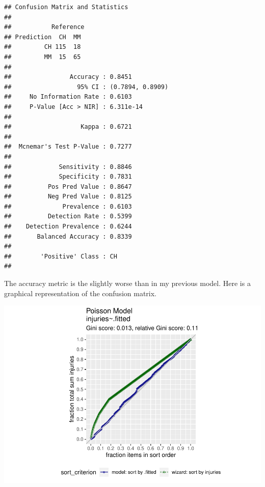 \documentclass[]{book}
\newenvironment{Shaded}{\begin{snugshade}}{\end{snugshade}}
\newcommand{\DataTypeTok}[1]{\textcolor[rgb]{0.13,0.29,0.53}{#1}}
\newcommand{\DecValTok}[1]{\textcolor[rgb]{0.00,0.00,0.81}{#1}}
\newcommand{\KeywordTok}[1]{\textcolor[rgb]{0.13,0.29,0.53}{\textbf{#1}}}
\newcommand{\NormalTok}[1]{#1}
\newcommand{\OperatorTok}[1]{\textcolor[rgb]{0.81,0.36,0.00}{\textbf{#1}}}
\newcommand{\StringTok}[1]{\textcolor[rgb]{0.31,0.60,0.02}{#1}}
\begin{document}
\begin{verbatim}
## Confusion Matrix and Statistics
## 
##           Reference
## Prediction  CH  MM
##         CH 115  18
##         MM  15  65
##                                           
##                Accuracy : 0.8451          
##                  95% CI : (0.7894, 0.8909)
##     No Information Rate : 0.6103          
##     P-Value [Acc > NIR] : 6.311e-14       
##                                           
##                   Kappa : 0.6721          
##                                           
##  Mcnemar's Test P-Value : 0.7277          
##                                           
##             Sensitivity : 0.8846          
##             Specificity : 0.7831          
##          Pos Pred Value : 0.8647          
##          Neg Pred Value : 0.8125          
##              Prevalence : 0.6103          
##          Detection Rate : 0.5399          
##    Detection Prevalence : 0.6244          
##       Balanced Accuracy : 0.8339          
##                                           
##        'Positive' Class : CH              
## 
\end{verbatim}

The accuracy metric is the slightly worse than in my previous model. Here is a graphical representation of the confusion matrix.

\begin{Shaded}
\end{Shaded}

\includegraphics{data-sci_files/figure-latex/unnamed-chunk-56-1.pdf}
\end{document}

